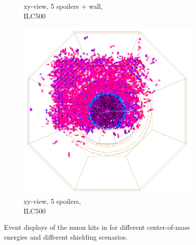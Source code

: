 \begin{figure}[!h]
\begin{subfigure}[b]{0.4\textwidth}
   \caption{xy-view, 5 spoilers + wall,\\ILC500}
   \end{subfigure}
   \hfill
    \begin{subfigure}[b]{0.4\textwidth}
   \centering
    \includegraphics[width=\textwidth]{Figures/BDS_muons/muons_positron_5spoilers_2961_xyview_croped_inverted.png}
   \caption{xy-view, 5 spoilers,\\ILC500}
   \end{subfigure}
   \caption[\sid Event displays of muon background from the ILC Beam Delivery System]{Event displays of the muon hits in \sid for different center-of-mass energies and different shielding scenarios.}
   \label{fig:BDS_Muons:wired4}
 \end{figure}
